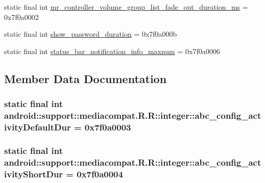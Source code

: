 \begin{CompactItemize}
\item 
static final int \hyperlink{classandroid_1_1support_1_1mediacompat_1_1_r_1_1integer_de3703708b4f0d925d40c192c758bd4d}{mr\_\-controller\_\-volume\_\-group\_\-list\_\-fade\_\-out\_\-duration\_\-ms} = 0x7f0a0002
\item 
static final int \hyperlink{classandroid_1_1support_1_1mediacompat_1_1_r_1_1integer_dd04f413195d77e519a885e729a00e0a}{show\_\-password\_\-duration} = 0x7f0a000b
\item 
static final int \hyperlink{classandroid_1_1support_1_1mediacompat_1_1_r_1_1integer_50c21f0643abffdbb953721285d6694d}{status\_\-bar\_\-notification\_\-info\_\-maxnum} = 0x7f0a0006
\end{CompactItemize}


\subsection{Member Data Documentation}
\hypertarget{classandroid_1_1support_1_1mediacompat_1_1_r_1_1integer_3e55fe2e5e33ca1dac6956e8cc150801}{
\subsubsection[{abc\_\-config\_\-activityDefaultDur}]{\setlength{\rightskip}{0pt plus 5cm}static final int android::support::mediacompat.R.R::integer::abc\_\-config\_\-activityDefaultDur = 0x7f0a0003}}
\label{classandroid_1_1support_1_1mediacompat_1_1_r_1_1integer_3e55fe2e5e33ca1dac6956e8cc150801}


\hypertarget{classandroid_1_1support_1_1mediacompat_1_1_r_1_1integer_695eafdf0a459b8f686380ea69119da9}{
\subsubsection[{abc\_\-config\_\-activityShortDur}]{\setlength{\rightskip}{0pt plus 5cm}static final int android::support::mediacompat.R.R::integer::abc\_\-config\_\-activityShortDur = 0x7f0a0004}}
\label{classandroid_1_1support_1_1mediacompat_1_1_r_1_1integer_695eafdf0a459b8f686380ea69119da9}


